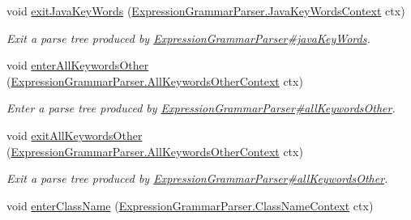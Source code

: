 \begin{DoxyCompactItemize}
void \hyperlink{interfacegov_1_1nasa_1_1jpf_1_1inspector_1_1server_1_1expression_1_1parser_1_1_expression_grammar_listener_a91ec0106d941960aa25bc93de06ab1bc}{exit\+Java\+Key\+Words} (\hyperlink{classgov_1_1nasa_1_1jpf_1_1inspector_1_1server_1_1expression_1_1parser_1_1_expression_grammar_parser_1_1_java_key_words_context}{Expression\+Grammar\+Parser.\+Java\+Key\+Words\+Context} ctx)
\begin{DoxyCompactList}\small\item\em Exit a parse tree produced by \hyperlink{classgov_1_1nasa_1_1jpf_1_1inspector_1_1server_1_1expression_1_1parser_1_1_expression_grammar_parser_ad2052f91a11b56131e3a746447f36634}{Expression\+Grammar\+Parser\#java\+Key\+Words}. \end{DoxyCompactList}\item 
void \hyperlink{interfacegov_1_1nasa_1_1jpf_1_1inspector_1_1server_1_1expression_1_1parser_1_1_expression_grammar_listener_a43ae0fd92aa4afe6d4f78c027ea9c6b5}{enter\+All\+Keywords\+Other} (\hyperlink{classgov_1_1nasa_1_1jpf_1_1inspector_1_1server_1_1expression_1_1parser_1_1_expression_grammar_pacb3381aaee949f84c436ba6b73657885}{Expression\+Grammar\+Parser.\+All\+Keywords\+Other\+Context} ctx)
\begin{DoxyCompactList}\small\item\em Enter a parse tree produced by \hyperlink{classgov_1_1nasa_1_1jpf_1_1inspector_1_1server_1_1expression_1_1parser_1_1_expression_grammar_parser_a785824ede173353ed534550da827b817}{Expression\+Grammar\+Parser\#all\+Keywords\+Other}. \end{DoxyCompactList}\item 
void \hyperlink{interfacegov_1_1nasa_1_1jpf_1_1inspector_1_1server_1_1expression_1_1parser_1_1_expression_grammar_listener_ae7e19d68d860f4c4f24b7dd07f182438}{exit\+All\+Keywords\+Other} (\hyperlink{classgov_1_1nasa_1_1jpf_1_1inspector_1_1server_1_1expression_1_1parser_1_1_expression_grammar_pacb3381aaee949f84c436ba6b73657885}{Expression\+Grammar\+Parser.\+All\+Keywords\+Other\+Context} ctx)
\begin{DoxyCompactList}\small\item\em Exit a parse tree produced by \hyperlink{classgov_1_1nasa_1_1jpf_1_1inspector_1_1server_1_1expression_1_1parser_1_1_expression_grammar_parser_a785824ede173353ed534550da827b817}{Expression\+Grammar\+Parser\#all\+Keywords\+Other}. \end{DoxyCompactList}\item 
void \hyperlink{interfacegov_1_1nasa_1_1jpf_1_1inspector_1_1server_1_1expression_1_1parser_1_1_expression_grammar_listener_a1abeea7267c0b24af835183ec97b61f4}{enter\+Class\+Name} (\hyperlink{classgov_1_1nasa_1_1jpf_1_1inspector_1_1server_1_1expression_1_1parser_1_1_expression_grammar_parser_1_1_class_name_context}{Expression\+Grammar\+Parser.\+Class\+Name\+Context} ctx)

\end{DoxyCompactItemize}
